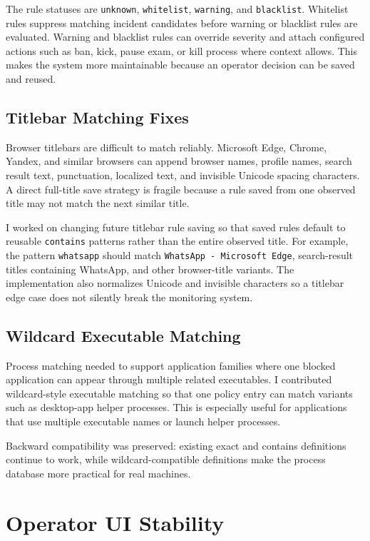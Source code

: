 \documentclass[conference]{IEEEtran}
\begin{document}
The rule statuses are \texttt{unknown}, \texttt{whitelist}, \texttt{warning}, and \texttt{blacklist}. Whitelist rules suppress matching incident candidates before warning or blacklist rules are evaluated. Warning and blacklist rules can override severity and attach configured actions such as ban, kick, pause exam, or kill process where context allows. This makes the system more maintainable because an operator decision can be saved and reused.

\subsection{Titlebar Matching Fixes}

Browser titlebars are difficult to match reliably. Microsoft Edge, Chrome, Yandex, and similar browsers can append browser names, profile names, search result text, punctuation, localized text, and invisible Unicode spacing characters. A direct full-title save strategy is fragile because a rule saved from one observed title may not match the next similar title.

I worked on changing future titlebar rule saving so that saved rules default to reusable \texttt{contains} patterns rather than the entire observed title. For example, the pattern \texttt{whatsapp} should match \texttt{WhatsApp - Microsoft Edge}, search-result titles containing WhatsApp, and other browser-title variants. The implementation also normalizes Unicode and invisible characters so a titlebar edge case does not silently break the monitoring system.

\subsection{Wildcard Executable Matching}

Process matching needed to support application families where one blocked application can appear through multiple related executables. I contributed wildcard-style executable matching so that one policy entry can match variants such as desktop-app helper processes. This is especially useful for applications that use multiple executable names or launch helper processes.

Backward compatibility was preserved: existing exact and contains definitions continue to work, while wildcard-compatible definitions make the process database more practical for real machines.

\section{Operator UI Stability}
\end{document}
